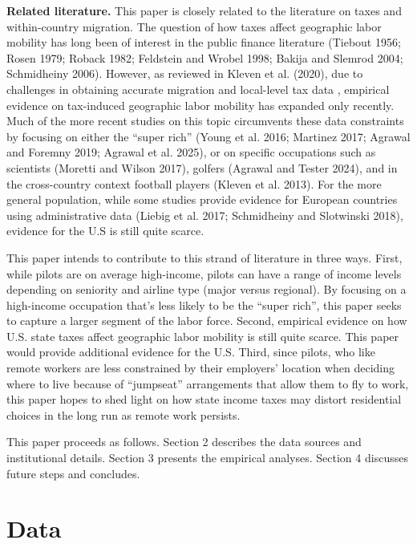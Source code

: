 \documentclass[11pt]{article}
\begin{document}
\textbf{Related literature.} This paper is closely related to the literature on taxes and within-country migration. The question of how taxes affect geographic labor mobility has long been of interest in the public finance literature (Tiebout 1956; Rosen 1979; Roback 1982; Feldstein and Wrobel 1998; Bakija and Slemrod 2004; Schmidheiny 2006). However, as reviewed in Kleven et al. (2020), due to challenges in obtaining accurate migration and local-level tax data , empirical evidence on tax-induced geographic labor mobility has expanded only recently. Much of the more recent studies on this topic circumvents these data constraints by focusing on either the ``super rich'' (Young et al. 2016; Martinez 2017; Agrawal and Foremny 2019; Agrawal et al. 2025), or on specific occupations such as scientists (Moretti and Wilson 2017), golfers (Agrawal and Tester 2024), and in the cross-country context football players (Kleven et al. 2013). For the more general population, while some studies provide evidence for European countries using administrative data (Liebig et al. 2017; Schmidheiny and Slotwinski 2018), evidence for the U.S is still quite scarce. 

This paper intends to contribute to this strand of literature in three ways. First, while pilots are on average high-income, pilots can have a range of income levels depending on seniority and airline type (major versus regional). By focusing on a high-income occupation that's less likely to be the ``super rich'', this paper seeks to capture a larger segment of the labor force. Second, empirical evidence on how U.S. state taxes affect geographic labor mobility is still quite scarce. This paper would provide additional evidence for the U.S. Third, since pilots, who like remote workers are less constrained by their employers' location when deciding where to live because of ``jumpseat'' arrangements that allow them to fly to work, this paper hopes to shed light on how state income taxes may distort residential choices in the long run as remote work persists.

This paper proceeds as follows. Section 2 describes the data sources and institutional details. Section 3 presents the empirical analyses. Section 4 discusses future steps and concludes.



\section{Data}
\end{document}
